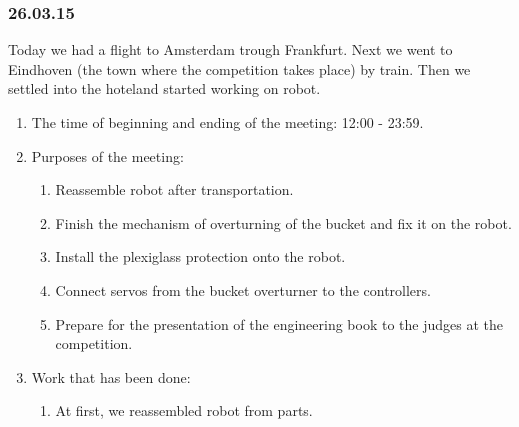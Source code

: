\subsubsection{26.03.15}

Today we had a flight to Amsterdam trough Frankfurt. Next we went to Eindhoven (the town where the competition takes place) by train. Then we settled into the hoteland started working on robot.

\begin{enumerate}
	
	\item The time of beginning and ending of the meeting: 12:00 - 23:59.
	
	\item Purposes of the meeting: 
	\begin{enumerate}
		
		\item Reassemble robot after transportation.
		
		\item Finish the mechanism of overturning of the bucket and fix it on the robot.
		
		\item Install the plexiglass protection onto the robot.
		
        \item Connect servos from the bucket overturner to the controllers.
        
        \item Prepare for the presentation of the engineering book to the judges at the competition.
		
	\end{enumerate}

	\item Work that has been done:
	\begin{enumerate}
		
		\item At first, we reassembled robot from parts.
		

\end{enumerate}
\end{enumerate}
